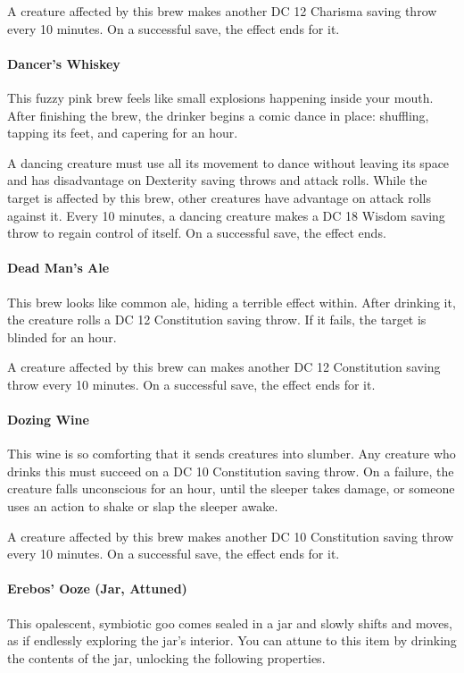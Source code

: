     A creature affected by this brew makes another DC 12 Charisma saving throw every 10 minutes.
    On a successful save, the effect ends for it.
\paragraph{Dancer's Whiskey} %
    This fuzzy pink brew feels like small explosions happening inside your mouth.
    After finishing the brew, the drinker begins a comic dance in place: shuffling, tapping its feet, and capering for an hour.

    A dancing creature must use all its movement to dance without leaving its space and has disadvantage on Dexterity saving throws and attack rolls.
    While the target is affected by this brew, other creatures have advantage on attack rolls against it.
    Every 10 minutes, a dancing creature makes a DC 18 Wisdom saving throw to regain control of itself.
    On a successful save, the effect ends.
\paragraph{Dead Man's Ale} %
    This brew looks like common ale, hiding a terrible effect within.
    After drinking it, the creature rolls a DC 12 Constitution saving throw.
    If it fails, the target is blinded for an hour.

    A creature affected by this brew can makes another DC 12 Constitution saving throw every 10 minutes.
    On a successful save, the effect ends for it.
\paragraph{Dozing Wine} %
    This wine is so comforting that it sends creatures into slumber.
    Any creature who drinks this must succeed on a DC 10 Constitution saving throw.
    On a failure, the creature falls unconscious for an hour, until the sleeper takes damage, or someone uses an action to shake or slap the sleeper awake.

    A creature affected by this brew makes another DC 10 Constitution saving throw every 10 minutes.
    On a successful save, the effect ends for it.
\paragraph{Erebos' Ooze (Jar, Attuned)} \label{item::erebosooze} %
    This opalescent, symbiotic goo comes sealed in a jar and slowly shifts and moves, as if endlessly exploring the jar's interior.
    You can attune to this item by drinking the contents of the jar, unlocking the following properties.

